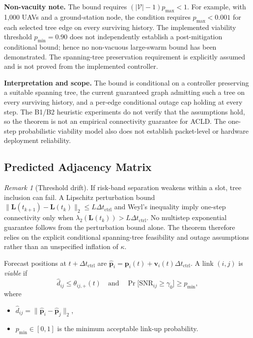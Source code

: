 \documentclass[preprint,12pt]{elsarticle}
\theoremstyle{definition}\newtheorem{definition}{Definition}
\theoremstyle{plain}\newtheorem{theorem}{Theorem}
\theoremstyle{plain}\newtheorem{lemma}{Lemma}
\theoremstyle{plain}\newtheorem{corollary}{Corollary}
\theoremstyle{plain}\newtheorem{assumption}{Assumption}
\theoremstyle{remark}\newtheorem{remark}[theorem]{Remark}
\begin{document}
\noindent\textbf{Non-vacuity note.} The bound requires $(|\mathcal V|-1)p_{\max}<1$. For example, with 1,000 UAVs and a ground-station node, the condition requires $p_{\max}<0.001$ for each selected tree edge on every surviving history. The implemented viability threshold $p_{\min}=0.90$ does not independently establish a post-mitigation conditional bound; hence no non-vacuous large-swarm bound has been demonstrated. The spanning-tree preservation requirement is explicitly assumed and is not proved from the implemented controller.\par
\noindent\textbf{Interpretation and scope.} The bound is conditional on a controller preserving a suitable spanning tree, the current guaranteed graph admitting such a tree on every surviving history, and a per-edge conditional outage cap holding at every step. The B1/B2 heuristic experiments do not verify that the assumptions hold, so the theorem is not an empirical connectivity guarantee for ACLD. The one-step probabilistic viability model also does not establish packet-level or hardware deployment reliability.


\subsection{Predicted Adjacency Matrix}
\label{subsec:prediction}

\begin{remark}[Threshold drift]
If risk-band separation weakens within a slot, tree inclusion can fail. A Lipschitz perturbation bound $\|\boldsymbol L(t_{k+1})-\boldsymbol L(t_k)\|_2\le L\Delta t_{\mathrm{ctrl}}$ and Weyl's inequality imply one-step connectivity only when $\lambda_2(\boldsymbol L(t_k))>L\Delta t_{\mathrm{ctrl}}$. No multistep exponential guarantee follows from the perturbation bound alone. The theorem therefore relies on the explicit conditional spanning-tree feasibility and outage assumptions rather than an unspecified inflation of $\kappa$.
\end{remark}

Forecast positions at $t+\Delta t_{\text{ctrl}}$ are
$\widehat{\boldsymbol p}_i=\boldsymbol p_i(t)+\boldsymbol v_i(t)\Delta t_{\text{ctrl}}$.  A link $(i,j)$ is \emph{viable} if
\begin{equation}
  \widehat d_{ij}\le\theta_{ij,+}(t)
  \quad\text{and}\quad
  \Pr\bigl[\text{SNR}_{ij}\ge\gamma_0\bigr]\ge p_{\min},
\end{equation}
where
\begin{itemize}[nosep]
  \item $\widehat d_{ij}=\|\widehat{\boldsymbol p}_i-\widehat{\boldsymbol p}_j\|_2$,
  \item $p_{\min}\in[0,1]$ is the minimum acceptable link‐up probability.
\end{itemize}
\end{document}
